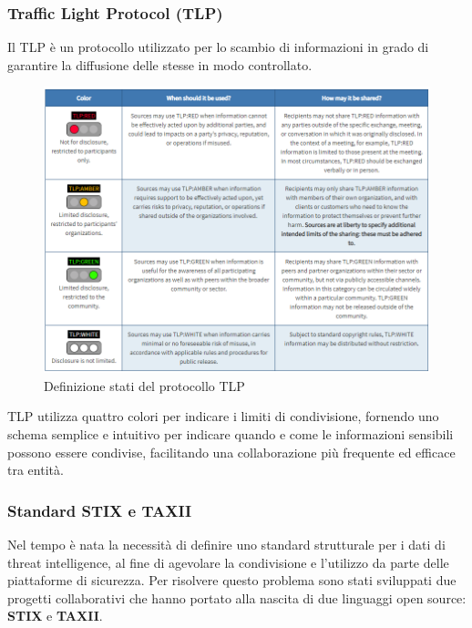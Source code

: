 \subsubsection{Traffic Light Protocol (TLP)}

Il TLP è un protocollo utilizzato per lo scambio di informazioni in grado di garantire la diffusione delle stesse in modo controllato. 

    \begin{figure}[h]
    \begin{center}
    \includegraphics[width=0.95\columnwidth]{images/3_CTI_img/tlp.png}
    \end{center}
    \caption{Definizione stati del protocollo TLP}
    \label{fig:Definizione stati del protocollo TLP}
    \end{figure}
    
TLP utilizza quattro colori per indicare i limiti di condivisione, fornendo uno schema semplice e intuitivo per indicare quando e come le informazioni sensibili possono essere condivise, facilitando una collaborazione più frequente ed efficace tra entità.

\subsubsection{Standard STIX e TAXII}

Nel tempo è nata la necessità di definire uno standard strutturale per i dati di threat intelligence, al fine di agevolare la condivisione e l’utilizzo da parte delle piattaforme di sicurezza. Per risolvere questo problema sono stati sviluppati due progetti collaborativi che hanno portato alla nascita di due linguaggi open source: \textbf{STIX} e \textbf{TAXII}.

